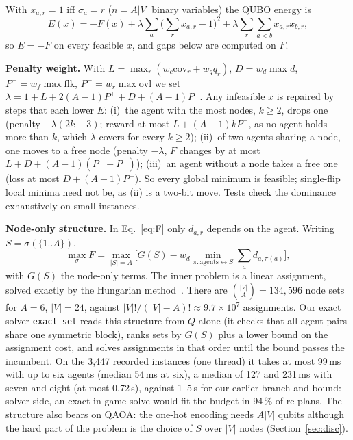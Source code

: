 \documentclass[sigconf]{acmart}
\begin{document}
With $x_{a,r}=1$ iff $\sigma_a=r$ ($n=A|V|$ binary variables) the QUBO energy is
\begin{equation}\label{eq:E}
E(x) = -F(x) + \lambda\sum_a\Big(\sum_r x_{a,r}-1\Big)^2 + \lambda\sum_r\sum_{a<b}x_{a,r}x_{b,r},
\end{equation}
so $E=-F$ on every feasible $x$, and gaps below are computed on $F$.

\textbf{Penalty weight.} With $L=\max_r(w_c\mathrm{cov}_r+w_q q_r)$, $D=w_d\max d$,
$P^+=w_f\max\mathrm{flk}$, $P^-=w_r\max\mathrm{ovl}$ we set
$\lambda = 1 + L + 2(A-1)P^+ + D + (A-1)P^-$. Any infeasible $x$ is repaired by steps that each lower
$E$: (i)~the agent with the most nodes, $k\ge2$, drops one (penalty $-\lambda(2k-3)$; reward at most
$L+(A-1)kP^+$, as no agent holds more than $k$, which $\lambda$ covers for every $k\ge2$); (ii)~of two agents sharing a node, one moves to a free node (penalty $-\lambda$, $F$
changes by at most $L+D+(A-1)(P^+ + P^-)$); (iii)~an agent without a node takes a free one (loss at
most $D+(A-1)P^-$). So every global minimum is feasible; single-flip local minima need not be, as
(ii) is a two-bit move. Tests check the dominance exhaustively on small instances.

\textbf{Node-only structure.} In Eq.~\eqref{eq:F} only $d_{a,r}$ depends on the agent. Writing
$S=\sigma(\{1..A\})$,
\begin{equation}\label{eq:set}
\max_\sigma F = \max_{|S|=A}\Big[G(S) - w_d \min_{\pi: \text{agents}\leftrightarrow S}\sum_a d_{a,\pi(a)}\Big],
\end{equation}
with $G(S)$ the node-only terms. The inner problem is a linear assignment, solved exactly by the
Hungarian method~\cite{Kuhn1955}. There are $\binom{|V|}{A}=134{,}596$ node sets for $A=6$,
$|V|=24$, against $|V|!/(|V|-A)! \approx 9.7\times10^7$ assignments. Our exact solver
\texttt{exact\_set} reads this structure from $Q$ alone (it checks that all agent pairs share one
symmetric block), ranks sets by $G(S)$ plus a lower bound on the assignment cost, and solves
assignments in that order until the bound passes the incumbent. On the 3{,}447 recorded instances
(one thread) it takes at most 99\,ms with up to six agents (median 54\,ms at six), a median of
127 and 231\,ms with seven and eight (at most 0.72\,s), against 1--5\,s for our earlier branch
and bound: solver-side, an exact in-game solve would fit the budget in 94\,\% of re-plans. The structure
also bears on QAOA: the one-hot encoding needs $A|V|$ qubits although the hard part of the problem
is the choice of $S$ over $|V|$ nodes (Section~\ref{sec:disc}).
\end{document}
